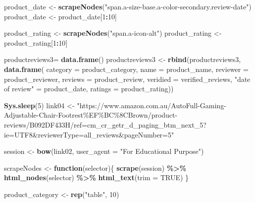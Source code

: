 \documentclass[
]{article}
\newenvironment{Shaded}{\begin{snugshade}}{\end{snugshade}}
\newcommand{\AttributeTok}[1]{\textcolor[rgb]{0.13,0.29,0.53}{#1}}
\newcommand{\ConstantTok}[1]{\textcolor[rgb]{0.56,0.35,0.01}{#1}}
\newcommand{\ControlFlowTok}[1]{\textcolor[rgb]{0.13,0.29,0.53}{\textbf{#1}}}
\newcommand{\DecValTok}[1]{\textcolor[rgb]{0.00,0.00,0.81}{#1}}
\newcommand{\FunctionTok}[1]{\textcolor[rgb]{0.13,0.29,0.53}{\textbf{#1}}}
\newcommand{\NormalTok}[1]{#1}
\newcommand{\OtherTok}[1]{\textcolor[rgb]{0.56,0.35,0.01}{#1}}
\newcommand{\SpecialCharTok}[1]{\textcolor[rgb]{0.81,0.36,0.00}{\textbf{#1}}}
\newcommand{\StringTok}[1]{\textcolor[rgb]{0.31,0.60,0.02}{#1}}
\begin{document}
\begin{Shaded}
\begin{Highlighting}[]
\NormalTok{  product\_date }\OtherTok{\textless{}{-}} \FunctionTok{scrapeNodes}\NormalTok{(}\StringTok{"span.a{-}size{-}base.a{-}color{-}secondary.review{-}date"}\NormalTok{)}
\NormalTok{  product\_date }\OtherTok{\textless{}{-}}\NormalTok{ product\_date[}\DecValTok{1}\SpecialCharTok{:}\DecValTok{10}\NormalTok{]}
  
\NormalTok{  product\_rating }\OtherTok{\textless{}{-}} \FunctionTok{scrapeNodes}\NormalTok{(}\StringTok{"span.a{-}icon{-}alt"}\NormalTok{)}
\NormalTok{  product\_rating }\OtherTok{\textless{}{-}}\NormalTok{ product\_rating[}\DecValTok{1}\SpecialCharTok{:}\DecValTok{10}\NormalTok{]}
  
\NormalTok{  productreviews3}\OtherTok{=} \FunctionTok{data.frame}\NormalTok{()}
\NormalTok{  productreviews3 }\OtherTok{\textless{}{-}} \FunctionTok{rbind}\NormalTok{(productreviews3, }\FunctionTok{data.frame}\NormalTok{(}
                      \AttributeTok{category =}\NormalTok{ product\_category,}
                      \AttributeTok{name =}\NormalTok{ product\_name,}
                      \AttributeTok{reviewer =}\NormalTok{ product\_reviewer,}
                      \AttributeTok{reviews =}\NormalTok{ product\_review,}
                      \AttributeTok{veridied =}\NormalTok{ verified\_reviews,}
                      \StringTok{"date of review"} \OtherTok{=}\NormalTok{ product\_date,}
                      \AttributeTok{ratings =}\NormalTok{ product\_rating))}
  
   \FunctionTok{Sys.sleep}\NormalTok{(}\DecValTok{5}\NormalTok{)}
\NormalTok{link04 }\OtherTok{\textless{}{-}} \StringTok{"https://www.amazon.com.au/AutoFull{-}Gaming{-}Adjustable{-}Chair{-}Footrest\%EF\%BC\%8CBrown/product{-}reviews/B092DF433H/ref=cm\_cr\_getr\_d\_paging\_btm\_next\_5?ie=UTF8\&reviewerType=all\_reviews\&pageNumber=5"}


\NormalTok{  session }\OtherTok{\textless{}{-}} \FunctionTok{bow}\NormalTok{(link02,}
               \AttributeTok{user\_agent =} \StringTok{"For Educational Purpose"}\NormalTok{)}

\NormalTok{  scrapeNodes }\OtherTok{\textless{}{-}} \ControlFlowTok{function}\NormalTok{(selector)\{}
    \FunctionTok{scrape}\NormalTok{(session) }\SpecialCharTok{\%\textgreater{}\%}
      \FunctionTok{html\_nodes}\NormalTok{(selector) }\SpecialCharTok{\%\textgreater{}\%}
      \FunctionTok{html\_text}\NormalTok{(}\AttributeTok{trim =} \ConstantTok{TRUE}\NormalTok{)}
\NormalTok{  \}}

\NormalTok{  product\_category }\OtherTok{\textless{}{-}} \FunctionTok{rep}\NormalTok{(}\StringTok{"table"}\NormalTok{, }\DecValTok{10}\NormalTok{)}


\end{Highlighting}
\end{Shaded}
\end{document}
